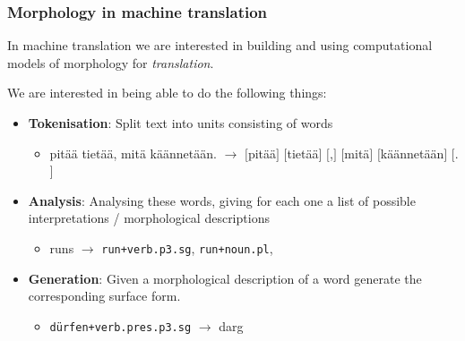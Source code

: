 \documentclass[10pt,xetex]{beamer} %
\begin{document}
\begin{frame}
{}
\end{frame}

\begin{frame}
  \frametitle{Morphology in machine translation}

In machine translation we are interested in building and using computational
models of morphology for {\em translation}.

We are interested in being able to do the following things:

\begin{itemize}
 \item {\bf Tokenisation}: Split text into units consisting of words
 \begin{itemize}
     \item pitää tietää, mitä käännetään. $\rightarrow$ $[$pitää$]$ $[$tietää$]$
         $[$,$]$ $[$mitä$]$ $[$käännetään$]$ $[$.$]$
 \end{itemize}
\item {\bf Analysis}: Analysing these words, giving for each one a list of
    possible interpretations / morphological descriptions
  \begin{itemize}
    \item runs $\rightarrow$ {\tt run+verb.p3.sg}, {\tt run+noun.pl},
  \end{itemize}
\item {\bf Generation}: Given a morphological description of a word generate the
    corresponding surface form.
  \begin{itemize}
    \item {\tt dürfen+verb.pres.p3.sg} $\rightarrow$ darg
  \end{itemize}
\end{itemize}

\end{frame}
\end{document}
